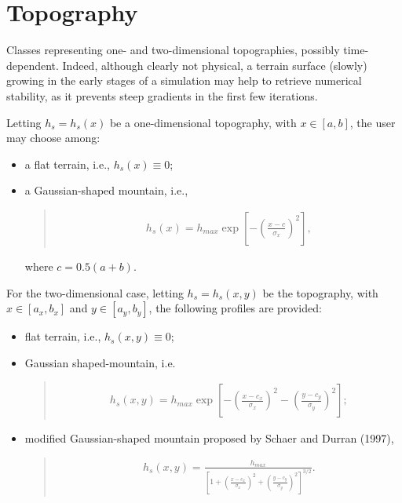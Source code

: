\documentclass[letterpaper,10pt,english]{sphinxmanual}
\begin{document}
\section{Topography}
\label{\detokenize{api:module-grids.topography}}\label{\detokenize{api:topography}}
Classes representing one- and two-dimensional topographies, possibly time-dependent.
Indeed, although clearly not physical, a terrain surface (slowly) growing in the early stages
of a simulation may help to retrieve numerical stability, as it prevents steep gradients
in the first few iterations.

Letting \(h_s = h_s(x)\) be a one-dimensional topography, with \(x \in [a,b]\),
the user may choose among:
\begin{itemize}
\item {} 
a flat terrain, i.e., \(h_s(x) \equiv 0\);

\item {} 
a Gaussian-shaped mountain, i.e.,
\begin{quote}
\begin{equation*}
\begin{split}h_s(x) = h_{max} \exp{\left[ - \left( \frac{x - c}{\sigma_x} \right)^2 \right]},\end{split}
\end{equation*}\end{quote}

where \(c = 0.5 (a + b)\).

\end{itemize}

For the two-dimensional case, letting \(h_s = h_s(x,y)\) be the topography, with
\(x \in [a_x,b_x]\) and \(y \in [a_y,b_y]\), the following profiles are provided:
\begin{itemize}
\item {} 
flat terrain, i.e., \(h_s(x,y) \equiv 0\);

\item {} 
Gaussian shaped-mountain, i.e.
\begin{quote}
\begin{equation*}
\begin{split}h_s(x,y) = h_{max} \exp{\left[ - \left( \frac{x - c_x}{\sigma_x} \right)^2 - \left( \frac{y - c_y}{\sigma_y} \right)^2 \right]} ;\end{split}
\end{equation*}\end{quote}

\item {} 
modified Gaussian-shaped mountain proposed by Schaer and Durran (1997),
\begin{quote}
\begin{equation*}
\begin{split}h_s(x,y) = \frac{h_{max}}{\left[ 1 + \left( \frac{x - c_x}{\sigma_x} \right)^2 + \left( \frac{y - c_y}{\sigma_y} \right)^2 \right]^{3/2}}.\end{split}
\end{equation*}\end{quote}

\end{itemize}
\end{document}
